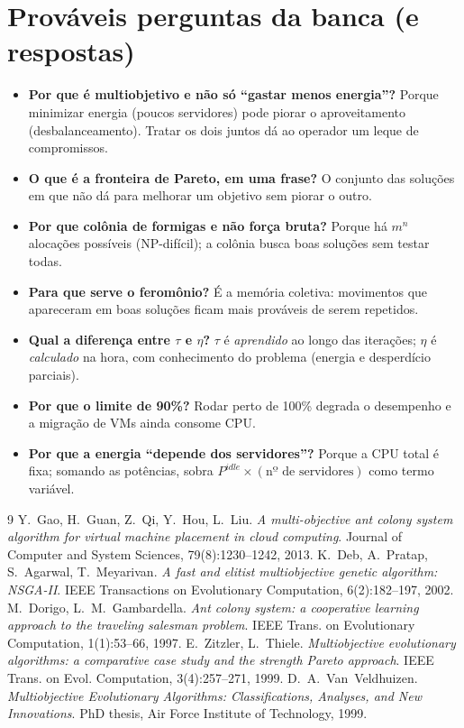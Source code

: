 \documentclass[11pt]{article}
\begin{document}
\section{Prováveis perguntas da banca (e respostas)}
\begin{itemize}[leftmargin=1.4em,itemsep=4pt]
  \item \textbf{Por que é multiobjetivo e não só ``gastar menos energia''?}
  Porque minimizar energia (poucos servidores) pode piorar o aproveitamento
  (desbalanceamento). Tratar os dois juntos dá ao operador um leque de
  compromissos.
  \item \textbf{O que é a fronteira de Pareto, em uma frase?} O conjunto das
  soluções em que não dá para melhorar um objetivo sem piorar o outro.
  \item \textbf{Por que colônia de formigas e não força bruta?} Porque há
  $m^n$ alocações possíveis (NP-difícil); a colônia busca boas soluções sem
  testar todas.
  \item \textbf{Para que serve o feromônio?} É a memória coletiva: movimentos que
  apareceram em boas soluções ficam mais prováveis de serem repetidos.
  \item \textbf{Qual a diferença entre $\tau$ e $\eta$?} $\tau$ é
  \emph{aprendido} ao longo das iterações; $\eta$ é \emph{calculado} na hora, com
  conhecimento do problema (energia e desperdício parciais).
  \item \textbf{Por que o limite de 90\%?} Rodar perto de 100\% degrada o
  desempenho e a migração de VMs ainda consome CPU.
  \item \textbf{Por que a energia ``depende dos servidores''?} Porque a CPU total
  é fixa; somando as potências, sobra $P^{idle}\times(\text{nº de servidores})$
  como termo variável.
\end{itemize}

\renewcommand{\refname}{Referências}
\begin{thebibliography}{9}\small
{} Y.~Gao, H.~Guan, Z.~Qi, Y.~Hou, L.~Liu. \emph{A multi-objective ant colony system algorithm for virtual machine placement in cloud computing}. Journal of Computer and System Sciences, 79(8):1230--1242, 2013.
 K.~Deb, A.~Pratap, S.~Agarwal, T.~Meyarivan. \emph{A fast and elitist multiobjective genetic algorithm: NSGA-II}. IEEE Transactions on Evolutionary Computation, 6(2):182--197, 2002.
 M.~Dorigo, L.~M.~Gambardella. \emph{Ant colony system: a cooperative learning approach to the traveling salesman problem}. IEEE Trans. on Evolutionary Computation, 1(1):53--66, 1997.
 E.~Zitzler, L.~Thiele. \emph{Multiobjective evolutionary algorithms: a comparative case study and the strength Pareto approach}. IEEE Trans. on Evol. Computation, 3(4):257--271, 1999.
 D.~A.~Van~Veldhuizen. \emph{Multiobjective Evolutionary Algorithms: Classifications, Analyses, and New Innovations}. PhD thesis, Air Force Institute of Technology, 1999.
\end{thebibliography}
\end{document}

